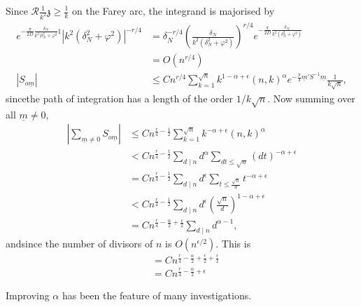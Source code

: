 Since $\mathscr{R} \frac{1}{k^2} \mathfrak{z} \geq \frac{1}{k}$ on the
  Farey arc, the integrand is majorised by
\begin{align*}
  e^{- \frac{\pi}{2D} \frac{\delta_N}{k^2 | \delta_N^2+ \varphi^2}1}
  |k^2 (\delta_N^2 + \varphi^2)|^{-r/4} & = \delta_N^{- r/4} \left(
  \frac{\delta_N}{k^2 (\delta_N^2 + \varphi^2)}\right)^{r/4} 
  e^{-\frac{\pi}{2D} \frac{\delta_N}{k^2 \left(\delta_N^2+ \varphi^2\right)}}\\
  & = O (n^{r/4})\\
  |S_{o\underline{m}}| & \leq C n^{r/4} \sum^{\sqrt{n}}_{k=1} k^{1-
    \alpha + \epsilon} (n, k)^{\alpha} e^{-\frac{\pi}{4} \underline{m}'
    S^{-1} \underline{m}} \frac{1}{k\sqrt{n}} ,
\end{align*}
since\pageoriginale the path of integration has a length of the order
$1/k\sqrt{n}$. Now summing over all $\underline{m}\neq 0$,
\begin{align*}
  \left|\sum_{\underline{m} \neq 0} S_{o \underline{m}}\right| & \leq
  C n^{\frac{r}{4}- \frac{1}{2}} \sum^{\sqrt{n}}_{k=1} k^{- \alpha +
    \epsilon} (n, k)^\alpha\\
  & < Cn^{\frac{r}{4} - \frac{1}{2}} \sum_{d\mid n} d^\alpha \sum_{dt \leq
  \sqrt{n}} (dt)^{- \alpha + \epsilon}\\
  & = C n^{\frac{r}{4}- \frac{1}{2}} \sum_{d\mid n} d^\epsilon \sum_{t \leq
    \frac{\sqrt{n}}{d}} t^{- \alpha + \epsilon}\\
  & < C n^{\frac{r}{4} - \frac{1}{2}} \sum_{d\mid n} d^\epsilon
  \left(\frac{\sqrt{n}}{d}\right)^{1- \alpha + \epsilon}\\
  & = C n^{\frac{r}{4} - \frac{\alpha}{2} + \frac{\epsilon}{2}}
  \sum_{d\mid n}  d^{\alpha -1},
\end{align*}
and\pageoriginale since the number of divisors of $n$ is $O
(n^{\epsilon/2})$. This is 
\begin{align*}
  & = C n^{\frac{r}{4} - \frac{\alpha}{2} + \frac{\epsilon}{2} +
    \frac{\epsilon}{2}}\\
  & = C n^{\frac{r}{4} - \frac{\alpha}{2}+ \epsilon}
\end{align*}

Improving $\alpha$ has been the feature of many investigations.
